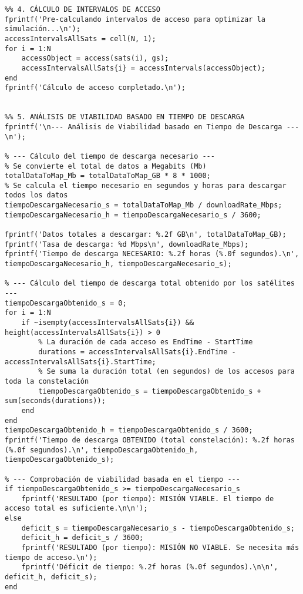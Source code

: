 \begin{verbatim}
%% 4. CÁLCULO DE INTERVALOS DE ACCESO
fprintf('Pre-calculando intervalos de acceso para optimizar la simulación...\n');
accessIntervalsAllSats = cell(N, 1);
for i = 1:N
    accessObject = access(sats(i), gs);
    accessIntervalsAllSats{i} = accessIntervals(accessObject);
end
fprintf('Cálculo de acceso completado.\n');


%% 5. ANÁLISIS DE VIABILIDAD BASADO EN TIEMPO DE DESCARGA
fprintf('\n--- Análisis de Viabilidad basado en Tiempo de Descarga ---\n');

% --- Cálculo del tiempo de descarga necesario ---
% Se convierte el total de datos a Megabits (Mb)
totalDataToMap_Mb = totalDataToMap_GB * 8 * 1000;
% Se calcula el tiempo necesario en segundos y horas para descargar todos los datos
tiempoDescargaNecesario_s = totalDataToMap_Mb / downloadRate_Mbps;
tiempoDescargaNecesario_h = tiempoDescargaNecesario_s / 3600;

fprintf('Datos totales a descargar: %.2f GB\n', totalDataToMap_GB);
fprintf('Tasa de descarga: %d Mbps\n', downloadRate_Mbps);
fprintf('Tiempo de descarga NECESARIO: %.2f horas (%.0f segundos).\n', tiempoDescargaNecesario_h, tiempoDescargaNecesario_s);

% --- Cálculo del tiempo de descarga total obtenido por los satélites ---
tiempoDescargaObtenido_s = 0;
for i = 1:N
    if ~isempty(accessIntervalsAllSats{i}) && height(accessIntervalsAllSats{i}) > 0
        % La duración de cada acceso es EndTime - StartTime
        durations = accessIntervalsAllSats{i}.EndTime - accessIntervalsAllSats{i}.StartTime;
        % Se suma la duración total (en segundos) de los accesos para toda la constelación
        tiempoDescargaObtenido_s = tiempoDescargaObtenido_s + sum(seconds(durations));
    end
end
tiempoDescargaObtenido_h = tiempoDescargaObtenido_s / 3600;
fprintf('Tiempo de descarga OBTENIDO (total constelación): %.2f horas (%.0f segundos).\n', tiempoDescargaObtenido_h, tiempoDescargaObtenido_s);

% --- Comprobación de viabilidad basada en el tiempo ---
if tiempoDescargaObtenido_s >= tiempoDescargaNecesario_s
    fprintf('RESULTADO (por tiempo): MISIÓN VIABLE. El tiempo de acceso total es suficiente.\n\n');
else
    deficit_s = tiempoDescargaNecesario_s - tiempoDescargaObtenido_s;
    deficit_h = deficit_s / 3600;
    fprintf('RESULTADO (por tiempo): MISIÓN NO VIABLE. Se necesita más tiempo de acceso.\n');
    fprintf('Déficit de tiempo: %.2f horas (%.0f segundos).\n\n', deficit_h, deficit_s);
end




\end{verbatim}
